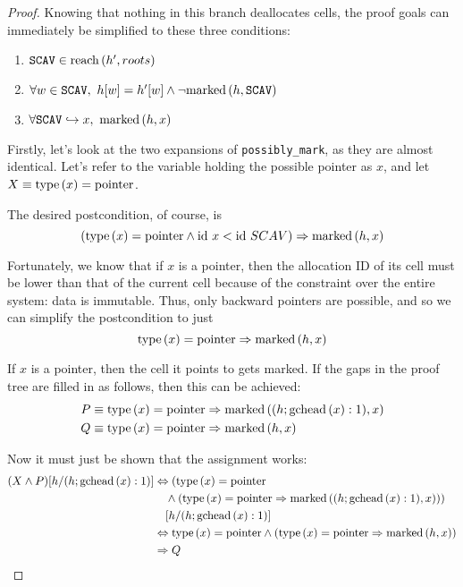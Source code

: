 \begin{proof}
  Knowing that nothing in this branch deallocates cells, the proof
  goals can immediately be simplified to these three conditions:
  \begin{enumerate}
    \item $\mathtt{SCAV} \in \reach{h'}{roots}$
    \item $\forall w \in \mathtt{SCAV},\ h[w] = h'[w] \land
      \lnot\marked{h}{\mathtt{SCAV}}$
    \item $\forall \mathtt{SCAV} \pointsto x,\ \marked{h}{x}$
  \end{enumerate}

  Firstly, let's look at the two expansions of
  \texttt{possibly\_mark}, as they are almost identical. Let's refer
  to the variable holding the possible pointer as $x$, and let $X
  \equiv \type{x} = \typointer$.
  \begin{prooftree}

  \end{prooftree}

  The desired postcondition, of course, is \[(\type{x} =
  \typointer \land \id~x < \id~SCAV) \implies \marked{h}{x}\]

  Fortunately, we know that if $x$ is a pointer, then the allocation
  ID of its cell must be lower than that of the current cell because
  of the constraint over the entire system: data is immutable. Thus,
  only backward pointers are possible, and so we can simplify the
  postcondition to just \[\type{x} = \typointer \implies
  \marked{h}{x}\]

  If $x$ is a pointer, then the cell it points to gets marked. If the
  gaps in the proof tree are filled in as follows, then this can be
  achieved:
  \begin{align*}
    P &\equiv \type{x} = \typointer \implies \marked{(h;
      \gchead{x}:1)}{x}\\
    Q &\equiv \type{x} = \typointer \implies \marked{h}{x}
  \end{align*}

  Now it must just be shown that the assignment works:
  \begin{align*}
    (X \land P)[h/(h; \gchead{x}:1)] &\iff (\type{x} =
      \typointer\\
    &\quad\land (\type{x} = \typointer \implies
      \marked{(h;\gchead{x}:1)}{x}))\\
    &\quad[h/(h; \gchead{x}:1)]\\
%
    &\iff \type{x} = \typointer \land (\type{x} =
    \typointer \implies \marked{h}{x})\\
%
    &\implies Q
  \end{align*}


\end{proof}

